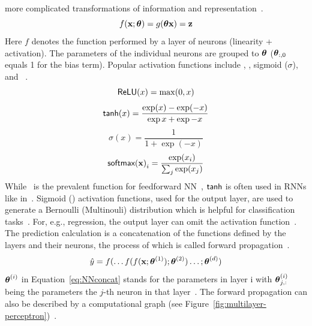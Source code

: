 more complicated transformations of information and representation~\citep{goodfellow_deep_2016}.
\begin{equation}\label{eq:neuron}
    f(\textbf{x};\boldsymbol{\theta}) = g(\boldsymbol{\theta}\textbf{x})=\textbf{z}
\end{equation}
Here $f$ denotes the function performed by a layer of neurons (linearity + activation).
The parameters of the individual neurons are grouped to $\boldsymbol{\theta}$ ($\boldsymbol{\theta}_{:,0}$ equals 1 for the
bias term).
Popular activation functions include \relu, \tahn, sigmoid ($\sigma$), and
\sfmx~\citep{shrestha_review_2019}.
\begin{equation}\label{eq:relu}
    \textsf{ReLU}(x)=\max(0,x)
\end{equation}
\begin{equation}\label{eq:tanh}
    \textsf{tanh}(x)=\frac{\exp(x)-\exp(-x)}{\exp{x}+\exp{-x}}
\end{equation}
\begin{equation}\label{eq:sigmoid}
    \sigma(x)=\frac{1}{1+\exp(-x)}
\end{equation}
\begin{equation}\label{eq:softmax}
    {\textsf{softmax}(\textbf{x})}_i = \frac{\exp(x_i)}{\sum_j \exp(x_j)}
\end{equation}
While \relu\ is the prevalent function for feedforward \ac{NN}~\citep{goodfellow_deep_2016},
$\textsf{tanh}$ is often used in \acp{RNN} like in~\cite{sherstinsky_fundamentals_2020,greff_lstm_2017}.
Sigmoid (\sfmx) activation functions, used for the output layer, are used to generate a Bernoulli
(Multinouli) distribution which is helpful for classification tasks~\citep{goodfellow_deep_2016}.
For, e.g., regression, the output layer can omit the activation
function~\citep{goodfellow_deep_2016}.
The prediction calculation is a concatenation of the functions defined by the
layers and their neurons, the process of which is called
forward propagation~\citep{ponti_everything_2017,goodfellow_deep_2016}.
\begin{equation}\label{eq:NNconcat}
    \hat{y}=f(\ldots f(f(\textbf{x};\boldsymbol{\theta}^{(1)});\boldsymbol{\theta}^{(2)})\ldots;\boldsymbol{\theta}^{(d)})
\end{equation}
$\boldsymbol{\theta}^{(i)}$ in Equation~\ref{eq:NNconcat} stands for the parameters in layer i with $\boldsymbol{\theta}^{(i)}_{j,:}$
being the parameters the $j$-th neuron in that layer~\citep{goodfellow_deep_2016}.
The forward propagation can also be described by a computational graph (see
Figure~\ref{fig:multilayer-perceptron})~\citep{goodfellow_deep_2016}.

